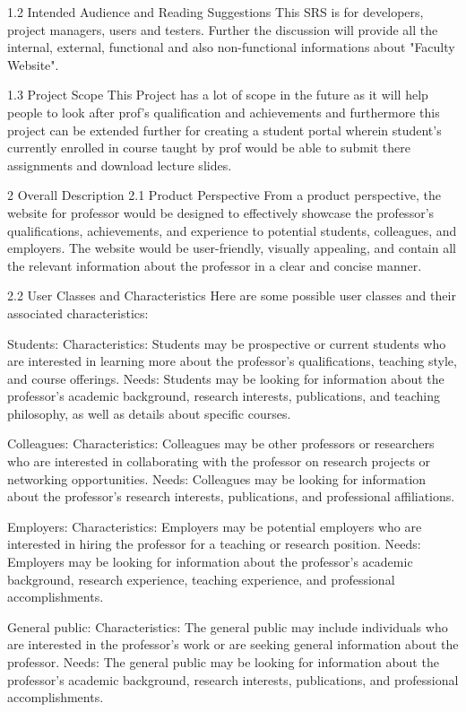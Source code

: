 1.2 Intended Audience and Reading Suggestions
This SRS is for developers, project managers, users and testers. Further the discussion
will provide all the internal, external, functional and also non-functional informations
about "Faculty Website".

1.3 Project Scope
  This Project has a lot of scope in the future as it will help people to look after prof's qualification and achievements and furthermore this project can be extended further for creating a student portal wherein student's currently enrolled in course taught by prof would be able to submit there assignments and download lecture slides.

2 Overall Description
2.1 Product Perspective 
From a product perspective, the website for professor would be designed to effectively showcase the professor's qualifications, achievements, and experience to potential students, colleagues, and employers. The website would be user-friendly, visually appealing, and contain all the relevant information about the professor in a clear and concise manner.

2.2 User Classes and Characteristics
Here are some possible user classes and their associated characteristics:

Students:
Characteristics: Students may be prospective or current students who are interested in learning more about the professor's qualifications, teaching style, and course offerings.
Needs: Students may be looking for information about the professor's academic background, research interests, publications, and teaching philosophy, as well as details about specific courses.

Colleagues:
Characteristics: Colleagues may be other professors or researchers who are interested in collaborating with the professor on research projects or networking opportunities.
Needs: Colleagues may be looking for information about the professor's research interests, publications, and professional affiliations.

Employers:
Characteristics: Employers may be potential employers who are interested in hiring the professor for a teaching or research position.
Needs: Employers may be looking for information about the professor's academic background, research experience, teaching experience, and professional accomplishments.

General public:
Characteristics: The general public may include individuals who are interested in the professor's work or are seeking general information about the professor.
Needs: The general public may be looking for information about the professor's academic background, research interests, publications, and professional accomplishments.

